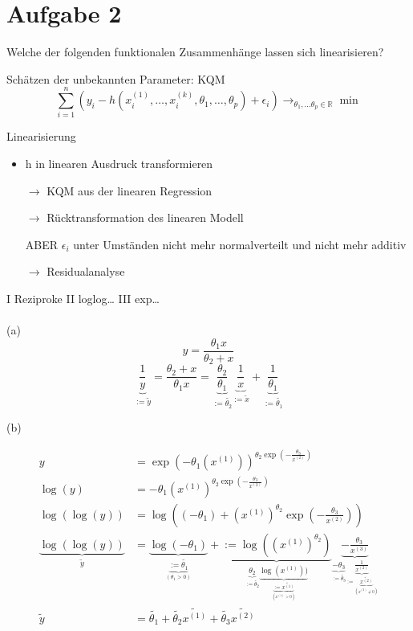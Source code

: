 \documentclass[10pt,a4paper]{article}
\begin{document}
\newpage
\section*{Aufgabe 2}
Welche der folgenden funktionalen Zusammenhänge lassen sich linearisieren?

Schätzen der unbekannten Parameter:
KQM
\[
\sum_{i = 1}^{n}(y_i - h (x_i^{(1)}, \ldots, x_i^{(k)}, \theta_1, \ldots, \theta_p)+ \epsilon_i) \rightarrow_{\theta_1,\ldots \theta_p \in \mathbb{R}} \min
\]

Linearisierung
\begin{itemize}
  \item h in linearen Ausdruck transformieren
  \item[\( \rightarrow \)] KQM aus der linearen Regression
  \item[\( \rightarrow \)] Rücktransformation des linearen Modell
  \item[ABER] \( \epsilon_i \) unter Umständen nicht mehr normalverteilt und nicht mehr additiv
  \item [\( \rightarrow \)] Residualanalyse

\end{itemize}
I Reziproke
II loglog\ldots
III exp\ldots \\\\

(a)
\[
y = \frac{\theta_1 x}{\theta_2 + x}\]
\[
\underbrace{\frac{1}{y}}_{:=\tilde{y}}	= \frac{\theta_2 + x}{\theta_1 x}
=\underbrace{ \frac{\theta_2}{\theta_1}}_{:=\tilde{\theta_2}}  \underbrace{\frac{1}{x}}_{:=\tilde{x}} + \underbrace{\frac{1}{\theta_1}}_{:=\tilde{\theta_1}}
\]

(b)

\begin{align*}
	y &= \exp(
	  -\theta_1(x^{(1)}))^
	  {\theta_2 \exp(-\frac{\theta_3}{x^{(2)}})}\\
	\log(y) &= {-\theta_1( x^{(1)} ) }^{\theta_2 \exp(-\frac{\theta_3}{x^{(2)}})}\\
	\log(\log(y)) &=
	\log((-\theta_1) + {(x^{(1)})}^{\theta_2} \exp(- \frac{\theta_3}{x^{(2)}}))\\
	\underbrace{\log(\log(y))}_{\tilde{y}} &=
		\underbrace{\log(-\theta_1)}_
			{\underbrace{:= \tilde{\theta_1}}_
				{(\theta_1>0)}} +
		\underbrace{:= \log((x^{(1)})^{\theta_2})}_
			{\underbrace{\theta_2}_
			 	{:= \tilde{\theta_2}}
			\underbrace{\log(x^{(1)}))}_
				{\underbrace{:= \tilde{x^{(1)}}}_
					{(x^{(1)}>0)}
				}
			}
		\underbrace{-\frac{\theta_3}{x^{(3)}}}_
			{\underbrace{-\theta_3}_
				{:= \tilde{\theta_3}}
			\underbrace{\frac{1}{x^{(2)}}}_
				{:= \underbrace{\tilde{x^{(2)}}}_
					{(x^{(2)} \neq 0)}
				}
		}\\
	\tilde{y} &= \tilde{\theta_1} +  \tilde{\theta_2}  \tilde{x^{(1)}} + \tilde{\theta_3} \tilde{x^{(2)}}
\end{align*}
\end{document}
